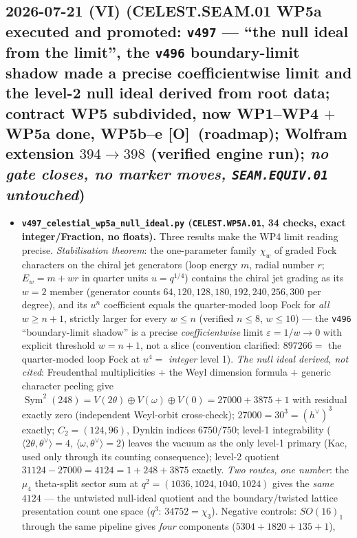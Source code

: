 \documentclass[11pt]{article}
\providecommand{\mO}{\textbf{[O]}}\providecommand{\mX}{\textbf{[X]}}
\begin{document}
\subsection*{2026-07-21 (VI) (CELEST.SEAM.01 WP5a executed and promoted: \texttt{v497} --- ``the null ideal from the limit'', the \texttt{v496} boundary-limit shadow made a precise coefficientwise limit and the level-2 null ideal derived from root data; contract WP5 subdivided, now WP1--WP4 $+$ WP5a done, WP5b--e \mO\ (roadmap); Wolfram extension $394\to398$ (verified engine run); \emph{no gate closes, no marker moves, \texttt{SEAM.EQUIV.01} untouched})}
\begin{itemize}[leftmargin=1.5em]
\item \textbf{\texttt{v497\_celestial\_wp5a\_null\_ideal.py} (\texttt{CELEST.WP5A.01}, 34 checks, exact
integer/Fraction, no floats).} Three results make the WP4 limit reading precise. \emph{Stabilisation
theorem}: the one-parameter family $\chi_w$ of graded Fock characters on the chiral jet generators
(loop energy $m$, radial number $r$; $E_w=m+wr$ in quarter units $u=q^{1/4}$) contains the chiral jet
grading as its $w{=}2$ member (generator counts $64,120,128,180,192,240,256,300$ per degree), and its
$u^n$ coefficient equals the quarter-moded loop Fock for \emph{all} $w\ge n{+}1$, strictly larger for
every $w\le n$ (verified $n\le8$, $w\le10$) --- the \texttt{v496} ``boundary-limit shadow'' is a
precise \emph{coefficientwise} limit $\varepsilon=1/w\to0$ with explicit threshold $w=n{+}1$, not a
slice (convention clarified: $897266=$ the quarter-moded loop Fock at $u^4=$ \emph{integer} level 1).
\emph{The null ideal derived, not cited}: Freudenthal multiplicities $+$ the Weyl dimension formula $+$
generic character peeling give $\operatorname{Sym}^2(248)=V(2\theta)\oplus V(\omega)\oplus
V(0)=27000+3875+1$ with residual exactly zero (independent Weyl-orbit cross-check);
$27000=30^3=(h^\vee)^3$ exactly; $C_2=(124,96)$, Dynkin indices $6750/750$; level-1 integrability
($\langle2\theta,\theta^\vee\rangle=4$, $\langle\omega,\theta^\vee\rangle=2$) leaves the vacuum as the
only level-1 primary (Kac, used only through its counting consequence); level-2 quotient
$31124-27000=4124=1+248+3875$ exactly. \emph{Two routes, one number}: the $\mu_4$ theta-split sector
sum at $q^2=(1036,1024,1040,1024)$ gives the \emph{same} $4124$ --- the untwisted null-ideal quotient
and the boundary/twisted lattice presentation count one space ($q^3$: $34752=\chi_3$). Negative
controls: $SO(16)_1$ through the same pipeline gives \emph{four} components ($5304+1820+135+1$),

\end{itemize}
\end{document}
